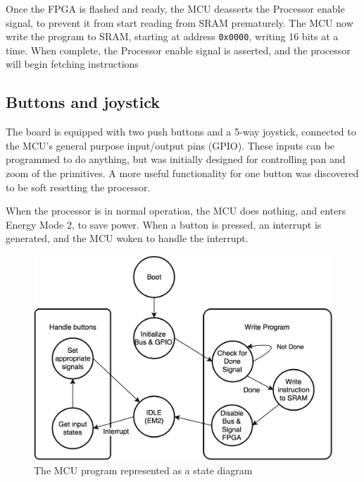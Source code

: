Once the FPGA is flashed and ready, the MCU deasserts the Processor enable signal, to prevent it from start reading from SRAM prematurely.
The MCU now write the program to SRAM, starting at address \texttt{0x0000}, writing 16 bits at a time.
When complete, the Processor enable signal is asserted, and the processor will begin fetching instructions

\subsection{Buttons and joystick}
The board is equipped with two push buttons and a 5-way joystick, connected to the MCU's general purpose input/output pins (GPIO).
These inputs can be programmed to do anything, but was initially designed for controlling pan and zoom of the primitives.
A more useful functionality for one button was discovered to be soft resetting the processor.

When the processor is in normal operation, the MCU does nothing, and enters Energy Mode 2, to save power.
When a button is pressed, an interrupt is generated, and the MCU woken to handle the interrupt.

\begin{figure}[h!]
\centering \includegraphics[width = 0.75\linewidth]{images/MCU_state.png}
\caption{The MCU program represented as a state diagram}
\label{fig:mcu_state}
\end{figure}